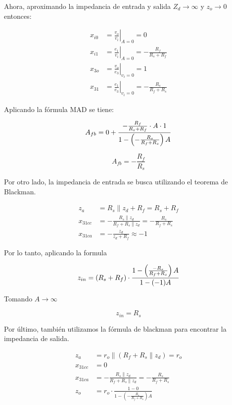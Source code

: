 Ahora, aproximando la impedancia de entrada y salida $Z_d \rightarrow \infty $ y $z_o \rightarrow 0$ entonces:

\begin{align*}
x_{i0} &= \left. \frac{v_o}{v_i} \right|_{A=0} = 0 \\
x_{i1} &= \left. \frac{e_1}{v_i} \right|_{A=0} = -\frac{R_f}{R_s + R_f} \\
x_{3o} &= \left. \frac{v_o}{e_3} \right|_{v_i=0} = 1 \\
x_{31} &= \left. \frac{e_1}{e_3} \right|_{v_i=0} = -\frac{R_s}{R_f + R_s}
\end{align*}

Aplicando la fórmula MAD se tiene: 

\begin{equation*}
A_{fb} = 0 + \frac{-\frac{R_f}{R_s + R_f} \cdot A \cdot 1}{1 - \left( -\frac{R_s}{R_f + R_s} \right) A} \\
\end{equation*}

\begin{equation}
    \boxed{A_{fb} = -\frac{R_f}{R_s}}
    \label{eq:mt-ganancia-amp-inversor}
\end{equation}


Por otro lado, la impedancia de entrada se busca utilizando el teorema de Blackman.

\begin{align*}
z_a &= R_s \parallel z_d + R_f = R_s + R_f \\
x_{31cc} &= -\frac{R_s \parallel z_d}{R_f + R_s \parallel z_d} = -\frac{R_s}{R_f + R_s} \\
x_{31ca} &= -\frac{z_d}{z_d + R_f} \approx -1
\end{align*}


Por lo tanto, aplicando la formula 

\begin{equation*}
z_{in} = (R_s + R_f) \cdot \frac{1 - \left( \frac{-R_s}{R_f + R_s} \right) A}{1 - (-1)A} \\
\end{equation*}

Tomando $A \rightarrow \infty$ 

\begin{equation}
    \boxed{z_{in} = R_s}
\end{equation}

Por último, también utilizamos la fórmula de blackman para encontrar la impedancia de salida.

\begin{align*}
z_a &= r_o \parallel (R_f + R_s \parallel z_d) = r_o \\
x_{31cc} &= 0 \\
x_{31ca} &= -\frac{R_s \parallel z_d}{R_f + R_s \parallel z_d} = -\frac{R_s}{R_f + R_s} \\
z_o &= r_o \cdot \frac{1 - 0}{1 - \left( -\frac{R_s}{R_f + R_s} \right) A} 
\end{align*}

